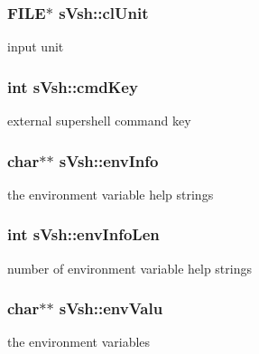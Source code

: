 \subsubsection[{cl\+Unit}]{\setlength{\rightskip}{0pt plus 5cm}F\+I\+L\+E$\ast$ s\+Vsh\+::cl\+Unit}\label{a00007_a61c33aa2071b43a85120b75d3984eeb3}


input unit 

\subsubsection[{cmd\+Key}]{\setlength{\rightskip}{0pt plus 5cm}int s\+Vsh\+::cmd\+Key}\label{a00007_aa246875bf82605333f30af61afe3ed54}


external supershell command key 

\subsubsection[{env\+Info}]{\setlength{\rightskip}{0pt plus 5cm}char$\ast$$\ast$ s\+Vsh\+::env\+Info}\label{a00007_a4b13b56b6059a20538b0eca39b1872b0}


the environment variable help strings 

\subsubsection[{env\+Info\+Len}]{\setlength{\rightskip}{0pt plus 5cm}int s\+Vsh\+::env\+Info\+Len}\label{a00007_a9f3e8263b78fe0574642e64ee6e30998}


number of environment variable help strings 

\subsubsection[{env\+Valu}]{\setlength{\rightskip}{0pt plus 5cm}char$\ast$$\ast$ s\+Vsh\+::env\+Valu}\label{a00007_a651413ef7fd726eef389669cff1f3e10}


the environment variables 

